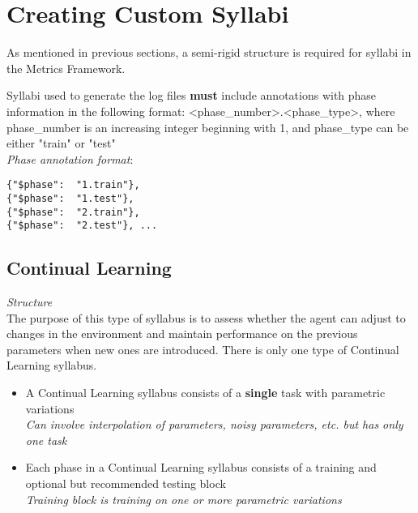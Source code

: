 \chapter{Creating Custom Syllabi}\label{ch:custom_syllabi}

As mentioned in previous sections, a semi-rigid structure is required for syllabi in the Metrics Framework.

Syllabi used to generate the log files \textbf{must} include annotations with phase information in the following format: <phase\_number>.<phase\_type>, where phase\_number is an increasing integer beginning with 1, and phase\_type can be either "train" or "test"  \\[0.1in]

\textit{Phase annotation format}:\\[0.1in]
 \begin{small}
\begin{verbatim}
{"$phase":  "1.train"},
{"$phase":  "1.test"},
{"$phase":  "2.train"},
{"$phase":  "2.test"}, ...
\end{verbatim}
\end{small}


\section{Continual Learning}
\textit{Structure}\\[0.1in]

The purpose of this type of syllabus is to assess whether the agent can adjust to changes in the environment and maintain performance on the previous parameters when new ones are introduced. There is only one type of Continual Learning syllabus.

\begin{itemize}
\item A Continual Learning syllabus consists of a \textbf{single} task with parametric variations\\
\textit{Can involve interpolation of parameters, noisy parameters, etc. but has only one task \\}


\item Each phase in a Continual Learning syllabus consists of a training and optional but recommended testing block\\
\textit{Training block is training on one or more parametric variations}\\[0.1in]
\end{itemize}

